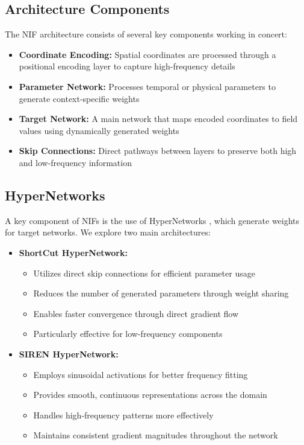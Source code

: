 \documentclass[10pt,journal,compsoc]{IEEEtran}
\begin{document}
\subsection{Architecture Components}
The NIF architecture consists of several key components working in concert:

\begin{itemize}
    \item \textbf{Coordinate Encoding:} Spatial coordinates are processed through a positional encoding layer to capture high-frequency details
    \item \textbf{Parameter Network:} Processes temporal or physical parameters to generate context-specific weights
    \item \textbf{Target Network:} A main network that maps encoded coordinates to field values using dynamically generated weights
    \item \textbf{Skip Connections:} Direct pathways between layers to preserve both high and low-frequency information
\end{itemize}

\subsection{HyperNetworks}
A key component of NIFs is the use of HyperNetworks \cite{hypernetworks2016}, which generate weights for target networks. We explore two main architectures:

\begin{itemize}
    \item \textbf{ShortCut HyperNetwork:} 
    \begin{itemize}
        \item Utilizes direct skip connections for efficient parameter usage
        \item Reduces the number of generated parameters through weight sharing
        \item Enables faster convergence through direct gradient flow
        \item Particularly effective for low-frequency components
    \end{itemize}
    
    \item \textbf{SIREN HyperNetwork:} 
    \begin{itemize}
        \item Employs sinusoidal activations for better frequency fitting \cite{siren2020}
        \item Provides smooth, continuous representations across the domain
        \item Handles high-frequency patterns more effectively
        \item Maintains consistent gradient magnitudes throughout the network
    \end{itemize}
\end{itemize}
\end{document}
